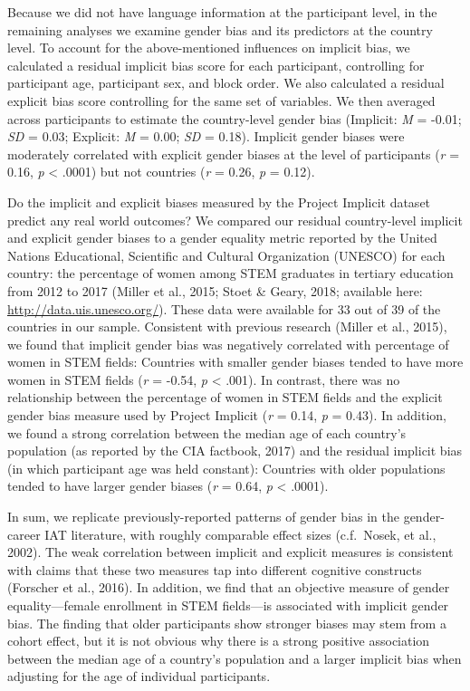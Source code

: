 \documentclass[9pt,twocolumn,twoside,lineno]{pnas-new}
\begin{document}
Because we did not have language information at the participant level,
in the remaining analyses we examine gender bias and its predictors at
the country level. To account for the above-mentioned influences on
implicit bias, we calculated a residual implicit bias score for each
participant, controlling for participant age, participant sex, and block
order. We also calculated a residual explicit bias score controlling for
the same set of variables. We then averaged across participants to
estimate the country-level gender bias (Implicit: \emph{M} = -0.01;
\emph{SD} = 0.03; Explicit: \emph{M} = 0.00; \emph{SD} = 0.18). Implicit
gender biases were moderately correlated with explicit gender biases at
the level of participants (\emph{r} = 0.16, \emph{p} \textless{} .0001)
but not countries (\emph{r} = 0.26, \emph{p} = 0.12).

Do the implicit and explicit biases measured by the Project Implicit
dataset predict any real world outcomes? We compared our residual
country-level implicit and explicit gender biases to a gender equality
metric reported by the United Nations Educational, Scientific and
Cultural Organization (UNESCO) for each country: the percentage of women
among STEM graduates in tertiary education from 2012 to 2017 (Miller et
al., 2015; Stoet \& Geary, 2018; available here:
\url{http://data.uis.unesco.org/}). These data were available for 33 out
of 39 of the countries in our sample. Consistent with previous research
(Miller et al., 2015), we found that implicit gender bias was negatively
correlated with percentage of women in STEM fields: Countries with
smaller gender biases tended to have more women in STEM fields (\emph{r}
= -0.54, \emph{p} \textless{} .001). In contrast, there was no
relationship between the percentage of women in STEM fields and the
explicit gender bias measure used by Project Implicit (\emph{r} = 0.14,
\emph{p} = 0.43). In addition, we found a strong correlation between the
median age of each country's population (as reported by the CIA
factbook, 2017) and the residual implicit bias (in which participant age
was held constant): Countries with older populations tended to have
larger gender biases (\emph{r} = 0.64, \emph{p} \textless{} .0001).

In sum, we replicate previously-reported patterns of gender bias in the
gender-career IAT literature, with roughly comparable effect sizes
(c.f.~Nosek, et al., 2002). The weak correlation between implicit and
explicit measures is consistent with claims that these two measures tap
into different cognitive constructs (Forscher et al., 2016). In
addition, we find that an objective measure of gender equality---female
enrollment in STEM fields---is associated with implicit gender bias. The
finding that older participants show stronger biases may stem from a
cohort effect, but it is not obvious why there is a strong positive
association between the median age of a country's population and a
larger implicit bias when adjusting for the age of individual
participants.
\end{document}
